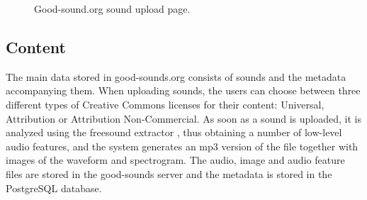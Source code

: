 \documentclass{article}
\begin{document}
\begin{figure}
 \centerline{}
 \caption{Good-sound.org sound upload page.}
 \label{fig:upload}
\end{figure}

\subsection{Content}
The main data stored in good-sounds.org consists of sounds and the metadata accompanying them. When uploading sounds, the users can choose between three different types of Creative Commons licenses for their content: Universal, Attribution or Attribution Non-Commercial. As soon as a sound is uploaded, it is analyzed using the freesound extractor \cite{02}, thus obtaining a number of low-level audio features, and the system generates an mp3 version of the file together with images of the waveform and spectrogram. The audio, image and audio feature files are stored in the good-sounds server and the metadata is stored in the PostgreSQL database. 
\end{document}
